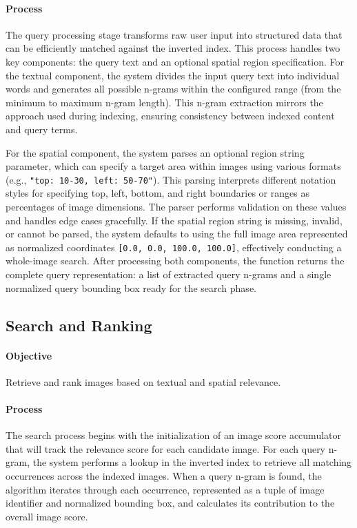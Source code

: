 \documentclass[manuscript,screen]{acmart}
\begin{document}
\paragraph{Process} The query processing stage transforms raw user input into structured data that can be efficiently matched against the inverted index. This process handles two key components: the query text and an optional spatial region specification. For the textual component, the system divides the input query text into individual words and generates all possible n-grams within the configured range (from the minimum to maximum n-gram length). This n-gram extraction mirrors the approach used during indexing, ensuring consistency between indexed content and query terms.

For the spatial component, the system parses an optional region string parameter, which can specify a target area within images using various formats (e.g., \verb|"top: 10-30, left: 50-70"|). This parsing interprets different notation styles for specifying top, left, bottom, and right boundaries or ranges as percentages of image dimensions. The parser performs validation on these values and handles edge cases gracefully. If the spatial region string is missing, invalid, or cannot be parsed, the system defaults to using the full image area represented as normalized coordinates \verb|[0.0, 0.0, 100.0, 100.0]|, effectively conducting a whole-image search. After processing both components, the function returns the complete query representation: a list of extracted query n-grams and a single normalized query bounding box ready for the search phase.

\subsection{Search and Ranking}

\paragraph{Objective} Retrieve and rank images based on textual and spatial relevance.

\paragraph{Process} The search process begins with the initialization of an image score accumulator that will track the relevance score for each candidate image. For each query n-gram, the system performs a lookup in the inverted index to retrieve all matching occurrences across the indexed images. When a query n-gram is found, the algorithm iterates through each occurrence, represented as a tuple of image identifier and normalized bounding box, and calculates its contribution to the overall image score.
\end{document}
